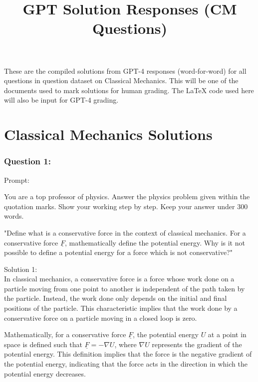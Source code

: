 \documentclass[a4paper,11pt]{article}
\begin{document}
\title{GPT Solution Responses (CM Questions)}
\author{}
\date{}
\maketitle

\noindent These are the compiled solutions from GPT-4 responses (word-for-word) for all questions in question dataset on Classical Mechanics. This will be one of the documents used to mark solutions for human grading. The LaTeX code used here will also be input for GPT-4 grading. 

\section{Classical Mechanics Solutions}

\subsubsection*{Question 1:}

Prompt:
\begin{spverbatim}
    You are a top professor of physics. Answer the physics problem given within the quotation marks. Show your working step by step. Keep your answer under 300 words.

    "Define what is a conservative force in the context of classical mechanics. For a conservative force \( \underline{F} \), mathematically define the potential energy. Why is it not possible to define a potential energy for a force which is not conservative?"
\end{spverbatim}

\bigskip

\noindent Solution 1: \\

In classical mechanics, a conservative force is a force whose work done on a particle moving from one point to another is independent of the path taken by the particle. Instead, the work done only depends on the initial and final positions of the particle. This characteristic implies that the work done by a conservative force on a particle moving in a closed loop is zero.

Mathematically, for a conservative force \( \underline{F} \), the potential energy \( U \) at a point in space is defined such that \( \underline{F} = -\nabla U \), where \( \nabla U \) represents the gradient of the potential energy. This definition implies that the force is the negative gradient of the potential energy, indicating that the force acts in the direction in which the potential energy decreases.
\end{document}
